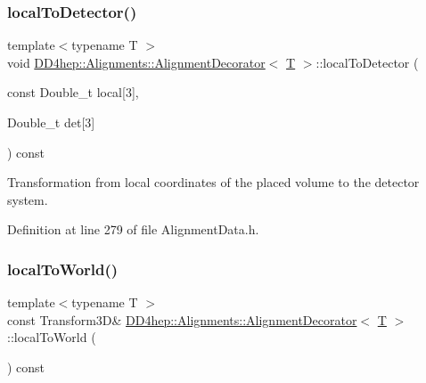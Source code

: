 \subsubsection{\texorpdfstring{local\+To\+Detector()}{localToDetector()}\hspace{0.1cm}{\footnotesize\ttfamily [2/2]}}
{\footnotesize\ttfamily template$<$typename T $>$ \\
void \hyperlink{class_d_d4hep_1_1_alignments_1_1_alignment_decorator}{D\+D4hep\+::\+Alignments\+::\+Alignment\+Decorator}$<$ \hyperlink{class_t}{T} $>$\+::local\+To\+Detector (\begin{DoxyParamCaption}\item[{const Double\+\_\+t}]{local\mbox{[}3\mbox{]},  }\item[{Double\+\_\+t}]{det\mbox{[}3\mbox{]} }\end{DoxyParamCaption}) const\hspace{0.3cm}{\ttfamily [inline]}}



Transformation from local coordinates of the placed volume to the detector system. 



Definition at line 279 of file Alignment\+Data.\+h.

\hypertarget{class_d_d4hep_1_1_alignments_1_1_alignment_decorator_a106ea95534d193b75e12184ad152624d}{}\label{class_d_d4hep_1_1_alignments_1_1_alignment_decorator_a106ea95534d193b75e12184ad152624d} 
\subsubsection{\texorpdfstring{local\+To\+World()}{localToWorld()}\hspace{0.1cm}{\footnotesize\ttfamily [1/3]}}
{\footnotesize\ttfamily template$<$typename T $>$ \\
const Transform3D\& \hyperlink{class_d_d4hep_1_1_alignments_1_1_alignment_decorator}{D\+D4hep\+::\+Alignments\+::\+Alignment\+Decorator}$<$ \hyperlink{class_t}{T} $>$\+::local\+To\+World (\begin{DoxyParamCaption}{ }\end{DoxyParamCaption}) const\hspace{0.3cm}{\ttfamily [inline]}}



